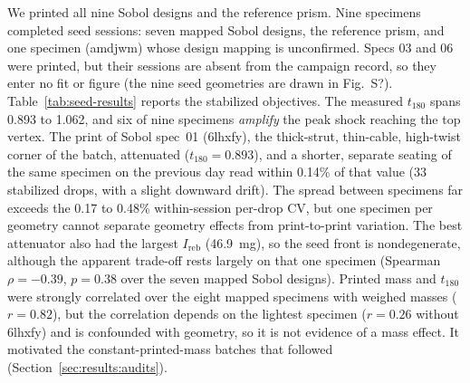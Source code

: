 \documentclass[11pt]{article}
\providecommand{\siref}[1]{S?}
\begin{document}
We printed all nine Sobol designs and the reference prism. Nine
specimens completed seed sessions: seven mapped Sobol designs, the
reference prism, and one specimen (amdjwm) whose design mapping is
unconfirmed. Specs 03 and 06 were printed, but their sessions are
absent from the campaign record, so they enter no fit or figure (the
nine seed geometries are drawn in Fig.~\siref{fig:si-seed-designs}).
Table~\ref{tab:seed-results} reports the stabilized objectives. The
measured $t_{180}$ spans 0.893 to 1.062, and six of nine specimens
\emph{amplify} the peak shock reaching the top vertex. The print of
Sobol spec~01 (6lhxfy), the thick-strut, thin-cable, high-twist corner
of the batch, attenuated ($t_{180} = 0.893$), and a shorter, separate
seating of the same specimen on the previous day read within 0.14\% of
that value (33 stabilized drops, with a slight downward drift). The
spread between
specimens far exceeds the 0.17 to 0.48\% within-session per-drop CV,
but one specimen per geometry cannot separate geometry effects from
print-to-print variation. The best attenuator also had the largest
$I_{\mathrm{reb}}$ (\SI{46.9}{mg}), so the seed front is nondegenerate,
although the apparent trade-off rests largely on that one specimen
(Spearman $\rho = -0.39$, $p = 0.38$ over the seven mapped Sobol
designs). Printed mass and $t_{180}$ were strongly correlated over the
eight mapped specimens with weighed masses ($r = 0.82$), but the
correlation depends on the lightest specimen ($r = 0.26$ without
6lhxfy) and is confounded with geometry, so it is not evidence of a
mass effect. It motivated the constant-printed-mass batches that
followed (Section~\ref{sec:results:audits}).
\end{document}
